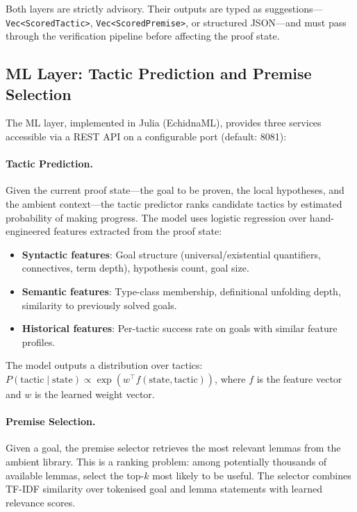 \documentclass[11pt,a4paper]{article}
\begin{document}
Both layers are strictly advisory. Their outputs are typed as suggestions---\texttt{Vec<ScoredTactic>}, \texttt{Vec<ScoredPremise>}, or
structured JSON---and must pass through the verification pipeline before
affecting the proof state.

\subsection{ML Layer: Tactic Prediction and Premise Selection}

The ML layer, implemented in Julia (EchidnaML), provides three services
accessible via a REST API on a configurable port (default: 8081):

\paragraph{Tactic Prediction.}
Given the current proof state---the goal to be proven, the local hypotheses,
and the ambient context---the tactic predictor ranks candidate tactics by
estimated probability of making progress. The model uses logistic regression
over hand-engineered features extracted from the proof state:

\begin{itemize}
  \item \textbf{Syntactic features}: Goal structure (universal/existential
  quantifiers, connectives, term depth), hypothesis count, goal size.
  \item \textbf{Semantic features}: Type-class membership, definitional
  unfolding depth, similarity to previously solved goals.
  \item \textbf{Historical features}: Per-tactic success rate on goals with
  similar feature profiles.
\end{itemize}

The model outputs a distribution over tactics:
$P(\text{tactic} \mid \text{state}) \propto \exp(w^\top f(\text{state}, \text{tactic}))$,
where $f$ is the feature vector and $w$ is the learned weight vector.

\paragraph{Premise Selection.}
Given a goal, the premise selector retrieves the most relevant lemmas from the
ambient library. This is a ranking problem: among potentially thousands of
available lemmas, select the top-$k$ most likely to be useful. The selector
combines TF-IDF similarity over tokenised goal and lemma statements with
learned relevance scores.
\end{document}
